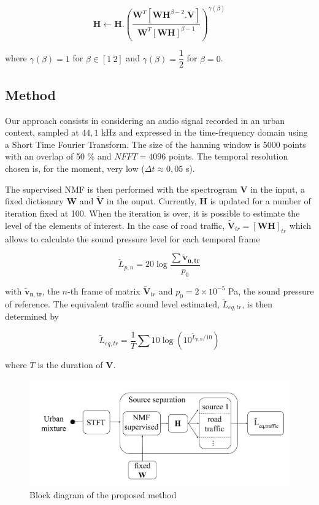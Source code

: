 \documentclass{article}
\begin{document}
\begin{sloppy}
\begin{equation}
\mathbf{H} \longleftarrow \mathbf{H}.\left(\frac{\mathbf{W}^T\left[\mathbf{WH}^{\beta-2}.\mathbf{V} \right]}{\mathbf{W}^T \left[ \mathbf{WH} \right]^{\beta-1}}\right)^{\gamma(\beta)}
\end{equation}

where $\gamma(\beta) = 1$ for $\beta \in [1~2]$ and $\gamma(\beta) = \dfrac{1}{2}$ for $\beta = 0$. 

\subsection{Method}

Our approach consists in considering an audio signal recorded in an urban context, sampled at $44,1$ kHz and expressed in the time-frequency domain using a Short Time Fourier Transform. The size of the hanning window is 5000 points with an overlap of 50 \% and $NFFT = 4096$ points. The temporal resolution chosen is, for the moment, very low ($\Delta t \approx 0,05$ s). 

The supervised NMF is then performed with the spectrogram $\mathbf{V}$ in the input, a fixed dictionary $\mathbf{W}$ and $\mathbf{\tilde{V}}$ in the ouput. Currently, $\mathbf{H}$ is updated for a number of iteration fixed at 100. When the iteration is over, it is possible to estimate the level of the elements of interest. In the case of road traffic, $\mathbf{\tilde{V}}_{tr} = \left[\mathbf{WH}\right]_{tr}$ which allows to calculate the sound pressure level for each temporal frame

\begin{equation}\label{eq:Lp}
\tilde{L}_{p,n} = 20\log\frac{\sum\mathbf{\mathbf{\tilde{v}}_{\mathbf{n},tr}}}{p_{0}}
\end{equation} 


with $\mathbf{\tilde{v}_{n,tr}}$, the $n$-th frame of matrix $\mathbf{\tilde{V}}_{tr}$ and $ p_{0} = 2\times 10^{-5}$ Pa, the sound pressure of reference. The equivalent traffic sound level estimated, $\tilde{L}_{eq,tr}$, is then determined by

\begin{equation}\label{eq:Leq}
\tilde{L}_{eq,tr} = \frac{1}{T} \sum 10\log \left(10^{\tilde{L}_{p,n}/10}\right)
\end{equation}

where $T$ is the duration of $\mathbf{V}$.\\

\begin{figure}[t]
\centering
\includegraphics[scale=0.35]{images/bloc1.pdf}
\caption{Block diagram of the proposed method}
\end{figure}



\end{sloppy}
\end{document}
